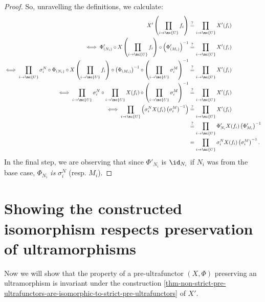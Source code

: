 \begin{proof}
    So, unravelling the definitions, we calculate:
    \begin{align*}
      X'\left(\prod_{i \to \mc{U}} f_i \right) &\overset{?}{=} \prod_{i \to \mc{U}} X'(f_i) \\
      \iff \Phi_{(N_i)}' \circ X \left(\prod_{i \to \mc{U}} f_i \right) \circ \left(\Phi'_{(M_i)}\right)^{-1} &\overset{?}{=}      \prod_{i \to \mc{U}} X'(f_i) \\
\iff \prod_{i \to \mc{U}} \sigma_i^N \circ \Phi_{(N_i)} \circ X \left(\prod_{i \to \mc{U}} f_i \right) \circ \left(\Phi_{(M_i)}\right)^{-1} \circ \left(\prod_{i \to \mc{U}} \sigma_i^M \right)^{-1} &\overset{?}{=}      \prod_{i \to \mc{U}} X'(f_i) \\
      \iff \prod_{i \to \mc{U}} \sigma_i^N \circ \prod_{i \to \mc{U}} X(f_i) \circ \left( \prod_{i \to \mc{U}} \sigma_i^M \right)^{-1}      &\overset{?}{=}      \prod_{i \to \mc{U}} X'(f_i) \\
      \iff \prod_{i \to \mc{U}} \left(\sigma_i^N X(f_i) \left(\sigma_i^M\right)^{-1}\right)    &\overset{?}{=}      \prod_{i \to \mc{U}} X'(f_i)\\
                                               &\overset{?}{=} \prod_{i \to \mc{U}} \Phi'_{N_i} X(f_i) \left(\Phi'_{M_i}\right)^{-1} \\
                                                 &= \prod_{i \to \mc{U}} \sigma_i^N X(f_i) \left(\sigma^M_i\right)^{-1}.
    \end{align*}
In the final step, we are observing that since $\Phi'_{N_i}$ is $\id_{N_i}$ if $N_i$ was from the base case, $\Phi_{N_i}$ \emph{is} $\sigma_i^N$ (resp. $M_i$).
\end{proof}


\section{Showing the constructed isomorphism respects preservation of ultramorphisms}

Now we will show that the property of a pre-ultrafunctor $(X, \Phi)$ preserving an ultramorphism is invariant under the construction \ref{thm-non-strict-pre-ultrafunctors-are-isomorphic-to-strict-pre-ultrafunctors} of $X'$.

